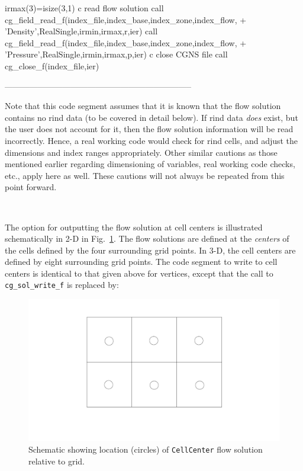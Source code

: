 \documentclass[12pt]{article}
\begin{document}
{\newline\indent      irmax(3)=isize(3,1)
\newline c   read flow solution
\newline\indent      call cg\_field\_read\_f(index\_file,index\_base,index\_zone,index\_flow,
\newline + \indent 'Density',RealSingle,irmin,irmax,r,ier)
\newline\indent      call cg\_field\_read\_f(index\_file,index\_base,index\_zone,index\_flow,
\newline + \indent 'Pressure',RealSingle,irmin,irmax,p,ier)
\newline c  close CGNS file
\newline\indent      call cg\_close\_f(index\_file,ier)}

--------------------------------------------------------------------

\noindent Note that this code segment assumes that it is known that
the flow solution contains no rind data (to be covered in detail
below).  If rind data {\it does} exist, but the user does not
account for it, then the flow solution information will be read
incorrectly.  Hence, a real working code would check for rind
cells, and adjust the dimensions and index ranges appropriately.
Other similar cautions as those mentioned earlier regarding
dimensioning of variables, real working code checks, etc.,
apply here as well.  These cautions will not always be repeated from
this point forward.

~

\noindent{}

The option for outputting the flow solution at cell centers
is illustrated schematically in 2-D in
Fig.~\ref{FIGcellcenter}.  The flow solutions are defined at
the {\it centers} of the cells defined by the 
four surrounding grid points.  In 3-D,
the cell centers are defined by eight surrounding grid points.
The code segment to write to cell centers is identical to that given
above for vertices, except that the call to
{\tt cg\_sol\_write\_f} is replaced by:

\begin{figure}[hpbt]
\centerline{{\includegraphics[width=120mm]{figures/cellcenter}}}
\caption{Schematic showing location (circles) of {\tt CellCenter}
flow solution relative to grid.}
\label{FIGcellcenter}
\end{figure}
%
\end{document}
